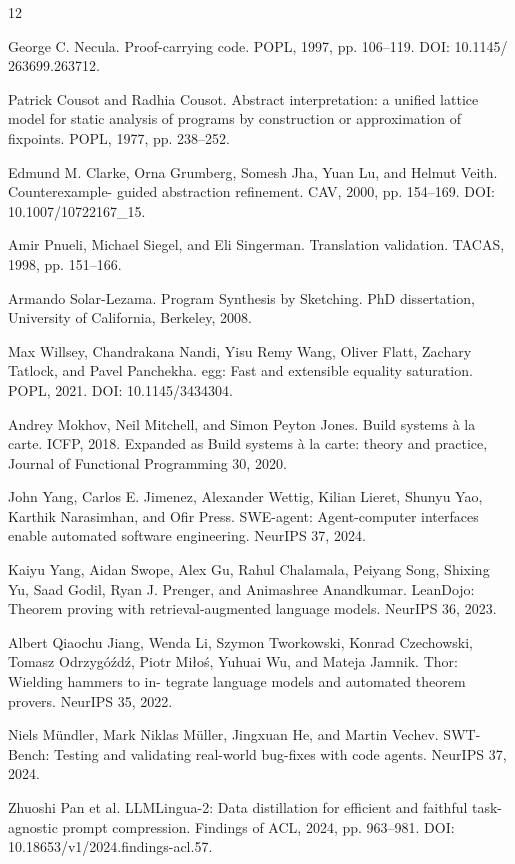 \begin{thebibliography}{12}

 George C. Necula. Proof-carrying code. POPL, 1997, pp. 106–119. DOI: 10.1145/ 263699.263712.

 Patrick Cousot and Radhia Cousot. Abstract interpretation: a unified lattice model for static analysis of programs by construction or approximation of fixpoints. POPL, 1977, pp. 238–252.

 Edmund M. Clarke, Orna Grumberg, Somesh Jha, Yuan Lu, and Helmut Veith. Counterexample- guided abstraction refinement. CAV, 2000, pp. 154–169. DOI: 10.1007/10722167\_15.

 Amir Pnueli, Michael Siegel, and Eli Singerman. Translation validation. TACAS, 1998, pp. 151–166.

 Armando Solar-Lezama. Program Synthesis by Sketching. PhD dissertation, University of California, Berkeley, 2008.

 Max Willsey, Chandrakana Nandi, Yisu Remy Wang, Oliver Flatt, Zachary Tatlock, and Pavel Panchekha. egg: Fast and extensible equality saturation. POPL, 2021. DOI: 10.1145/3434304.

 Andrey Mokhov, Neil Mitchell, and Simon Peyton Jones. Build systems à la carte. ICFP, 2018. Expanded as Build systems à la carte: theory and practice, Journal of Functional Programming 30, 2020.

 John Yang, Carlos E. Jimenez, Alexander Wettig, Kilian Lieret, Shunyu Yao, Karthik Narasimhan, and Ofir Press. SWE-agent: Agent-computer interfaces enable automated software engineering. NeurIPS 37, 2024.

 Kaiyu Yang, Aidan Swope, Alex Gu, Rahul Chalamala, Peiyang Song, Shixing Yu, Saad Godil, Ryan J. Prenger, and Animashree Anandkumar. LeanDojo: Theorem proving with retrieval-augmented language models. NeurIPS 36, 2023.

 Albert Qiaochu Jiang, Wenda Li, Szymon Tworkowski, Konrad Czechowski, Tomasz Odrzygóźdź, Piotr Miłoś, Yuhuai Wu, and Mateja Jamnik. Thor: Wielding hammers to in- tegrate language models and automated theorem provers. NeurIPS 35, 2022.

 Niels Mündler, Mark Niklas Müller, Jingxuan He, and Martin Vechev. SWT-Bench: Testing and validating real-world bug-fixes with code agents. NeurIPS 37, 2024.

 Zhuoshi Pan et al. LLMLingua-2: Data distillation for efficient and faithful task-agnostic prompt compression. Findings of ACL, 2024, pp. 963–981. DOI: 10.18653/v1/2024.findings-acl.57.

\end{thebibliography}
